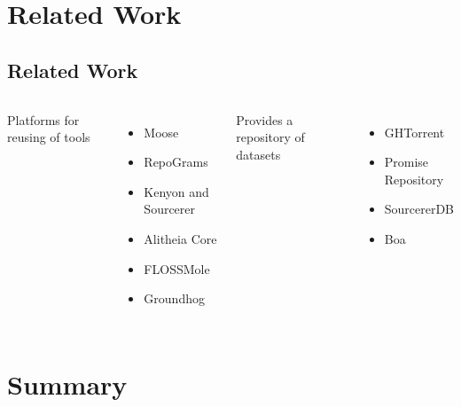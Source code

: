 \section*{Related Work}
\subsection{Related Work}
    \begin{frame}
       \begin{columns}
                Platforms for reusing of tools
                \begin{itemize}
                    \item Moose
                    \item RepoGrams
                    \item Kenyon and Sourcerer
                    \item Alitheia Core
                    \item FLOSSMole
                    \item Groundhog
                \end{itemize}

                Provides a repository of datasets
                \begin{itemize}
                    \item GHTorrent
                    \item Promise Repository
                    \item SourcererDB
                    \item Boa
                \end{itemize}
        \end{columns}
    \end{frame}

\section{Summary}
